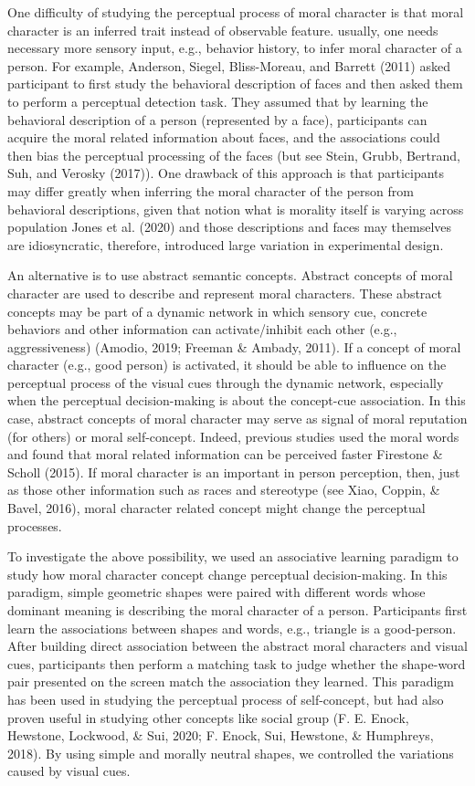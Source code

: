 \documentclass[
  english,
  man]{apa6}
\begin{document}
One difficulty of studying the perceptual process of moral character is that moral character is an inferred trait instead of observable feature. usually, one needs necessary more sensory input, e.g., behavior history, to infer moral character of a person. For example, Anderson, Siegel, Bliss-Moreau, and Barrett (2011) asked participant to first study the behavioral description of faces and then asked them to perform a perceptual detection task. They assumed that by learning the behavioral description of a person (represented by a face), participants can acquire the moral related information about faces, and the associations could then bias the perceptual processing of the faces (but see Stein, Grubb, Bertrand, Suh, and Verosky (2017)). One drawback of this approach is that participants may differ greatly when inferring the moral character of the person from behavioral descriptions, given that notion what is morality itself is varying across population Jones et al. (2020) and those descriptions and faces may themselves are idiosyncratic, therefore, introduced large variation in experimental design.

An alternative is to use abstract semantic concepts. Abstract concepts of moral character are used to describe and represent moral characters. These abstract concepts may be part of a dynamic network in which sensory cue, concrete behaviors and other information can activate/inhibit each other (e.g., aggressiveness) (Amodio, 2019; Freeman \& Ambady, 2011). If a concept of moral character (e.g., good person) is activated, it should be able to influence on the perceptual process of the visual cues through the dynamic network, especially when the perceptual decision-making is about the concept-cue association. In this case, abstract concepts of moral character may serve as signal of moral reputation (for others) or moral self-concept. Indeed, previous studies used the moral words and found that moral related information can be perceived faster Firestone \& Scholl (2015). If moral character is an important in person perception, then, just as those other information such as races and stereotype (see Xiao, Coppin, \& Bavel, 2016), moral character related concept might change the perceptual processes.

To investigate the above possibility, we used an associative learning paradigm to study how moral character concept change perceptual decision-making. In this paradigm, simple geometric shapes were paired with different words whose dominant meaning is describing the moral character of a person. Participants first learn the associations between shapes and words, e.g., triangle is a good-person. After building direct association between the abstract moral characters and visual cues, participants then perform a matching task to judge whether the shape-word pair presented on the screen match the association they learned. This paradigm has been used in studying the perceptual process of self-concept, but had also proven useful in studying other concepts like social group (F. E. Enock, Hewstone, Lockwood, \& Sui, 2020; F. Enock, Sui, Hewstone, \& Humphreys, 2018). By using simple and morally neutral shapes, we controlled the variations caused by visual cues.
\end{document}
